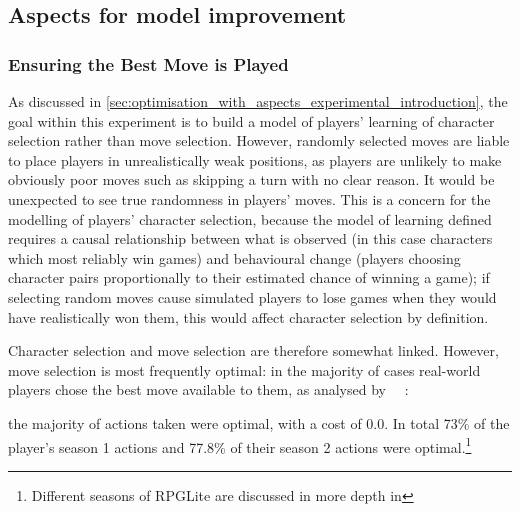 \subsection{Aspects for model improvement}\label{subsec:aspects_improving_model}

\subsubsection{Ensuring the Best Move is Played}\label{subsubsec:ensure_best_move}


As discussed in \cref{sec:optimisation_with_aspects_experimental_introduction},
the goal within this experiment is to build a model of players' learning of
character selection rather than move selection. However, randomly selected moves
are liable to place players in unrealistically weak positions, as players are
unlikely to make obviously poor moves such as skipping a turn with no clear
reason. It would be unexpected to see true randomness in players' moves. This is
a concern for the modelling of players' character selection, because the model
of learning defined requires a causal relationship between what is observed (in
this case characters which most reliably win games) and behavioural change
(players choosing character pairs proportionally to their estimated chance of
winning a game); if selecting random moves cause simulated players to lose games
when they would have realistically won them, this would affect character
selection by definition.

Character selection and move selection are therefore somewhat linked. However,
move selection is most frequently optimal: in the majority of cases real-world
players chose the best move available to them, as analysed by \citeauthor{kavanagh2021gameplay}~\cite{kavanagh2021gameplay}~:

\begin{displayquote}
  [\ldots{}] the majority of actions taken were optimal, with a cost of 0.0. In
  total 73\% of the player’s season 1 actions and 77.8\% of their season 2
  actions were optimal.\footnote{Different seasons of RPGLite are discussed in
  more depth in }
\end{displayquote}

